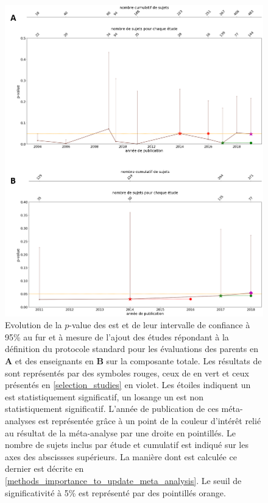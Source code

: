 \begin{figure}[h!]
  \centering
	\includegraphics[width=1\linewidth]{figures/chapter-2/meta-analysis-evolution-pvalue-std} 
  \caption{Evolution de la $p$-value des \gls{est} et de leur intervalle de confiance à 95\% au fur et à mesure de l'ajout des études répondant à la définition du protocole standard pour les évaluations des 
	parents en \textbf{A} et des enseignants en \textbf{B} sur la composante totale.
  Les résultats de \citep{Cortese2016} sont représentés par des symboles rouges, ceux de \citet{Bussalb2019clinical} en vert et ceux présentés en \ref{selection_studies} en violet. Les étoiles 
	indiquent un \gls{est} statistiquement significatif, un losange un \gls{est} non statistiquement significatif. L'année de publication de ces méta-analyses est représentée grâce à un point de la couleur 
	d'intérêt relié au résultat de la méta-analyse par une droite en pointillés.
	Le nombre de sujets inclus par étude et cumulatif est indiqué sur les axes des abscissses supérieurs. La manière dont est calculée ce dernier est 
	décrite en \ref{methods_importance_to_update_meta_analysis}.
	Le seuil de significativité à 5\% est représenté par des pointillés orange.}
  \label{Figure:meta_analysis_evolution_pvalue_std}
\end{figure}

